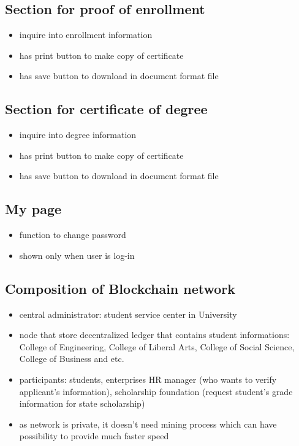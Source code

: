 \documentclass[conference]{IEEEtran}
\begin{document}
\subsection{Section for proof of enrollment}
\begin{itemize}
\item inquire into enrollment information
\item has print button to make copy of certificate
\item has save button to download in document format file
\end{itemize}

\subsection{Section for certificate of degree}
\begin{itemize}
\item inquire into degree information
\item has print button to make copy of certificate
\item has save button to download in document format file
\end{itemize}

\subsection{My page}
\begin{itemize}
\item function to change password
\item shown only when user is log-in 
\end{itemize}


\subsection{Composition of Blockchain network}
\begin{itemize}
\item central administrator: student service center in University
\item node that store decentralized ledger that contains student informations: College of Engineering, College of Liberal Arts, College of Social Science, College of Business and etc.
\item participants: students, enterprises HR manager (who wants to verify applicant's information), scholarship foundation (request student's grade information for state scholarship)
\item as network is private, it doesn't need mining process which can have possibility to provide much faster speed
\end{itemize}
\end{document}
